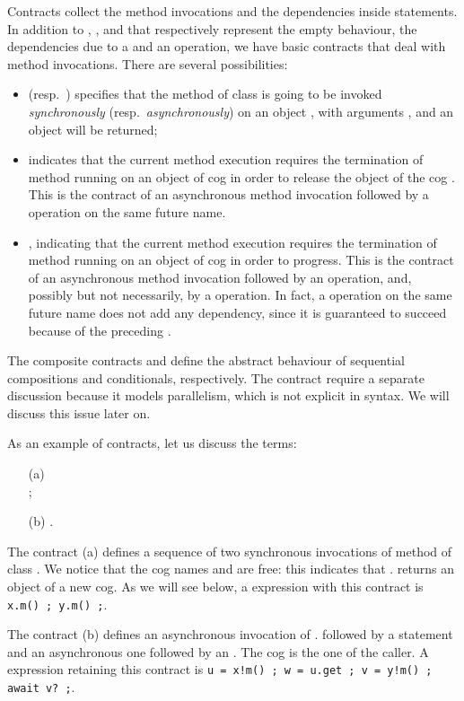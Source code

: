 Contracts  collect the method 
invocations and the dependencies inside statements. 
In addition to , , and  that
respectively represent the empty behaviour, the dependencies due to a
 and an  operation, we have basic contracts that deal
with method invocations.
There are several possibilities:
\begin{itemize}
\item 

(resp.~) 
specifies that 
the method {\m} of class {\C} is going to be invoked \emph{synchronously}
(resp.~\emph{asynchronously})
on an object , with arguments
, and an object  will be returned;
\item
 indicates that 
the current method execution requires the termination of method 
 running on an object of cog  in order to release the object of the cog . 
This is the contract of an asynchronous method invocation followed by a  operation on 
the same future name.
\item
, 
indicating that the current method execution requires
the termination of method  running on an object of cog  in order to 
progress. This is the contract of an asynchronous method invocation followed by
an  operation, and, possibly but not necessarily, by a 
operation.
In fact, a  operation on the same future name does not add any
dependency, since it is guaranteed to succeed because of the preceding
.
\end{itemize}
The composite contracts  and 
define the abstract behaviour of sequential compositions and
conditionals, respectively.
The contract  require a 
separate discussion because it models parallelism, which is not explicit
in {\coreABS} syntax. We will discuss this issue later on.




\begin{example}
As an example of contracts, let us discuss the terms:
\begin{enumerate}
\item[(a)] \\
 ;
 
 \medskip
 
\item[(b)] 
. 
\end{enumerate}
The contract (a) defines a sequence of two synchronous invocations of method {\m} of class {\C}. We notice that the cog names  and  are free: this indicates
that {\C.\m} returns an object of a new cog.
As we will see below, a {\coreABS} expression with  
this contract is {\tt x.m() ; y.m() ;}.


The contract (b) defines an asynchronous invocation of {\C.\m} followed by a  
statement and an asynchronous one followed by an .
The cog  is the one of the caller.
A {\coreABS} expression retaining 
this contract is {\tt u = x!m() ; w = u.get ; v = y!m() ; await v? ;}.
\end{example}

